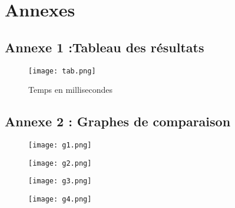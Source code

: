\chapter{Annexes}
\section{Annexe 1 :Tableau des résultats}
\begin{figure}[!h] 
\begin{center}
  \texttt{[image: tab.png]}
  \caption{Temps en millisecondes}
\end{center}

\end{figure}
\clearpage
 \section{Annexe 2 : Graphes de comparaison}
\begin{figure}[!h] 
\begin{center}
  \texttt{[image: g1.png]}
 \end{center}
\end{figure}
\clearpage
\begin{figure}[!h] 
\begin{center}
  \texttt{[image: g2.png]}
 \end{center}
\end{figure}
\clearpage
\begin{figure}[!h] 
\begin{center}
  \texttt{[image: g3.png]}
 \end{center}
\end{figure}
\clearpage\begin{figure}[!h] 
\begin{center}
  \texttt{[image: g4.png]}
 \end{center}
\end{figure}
\clearpage
